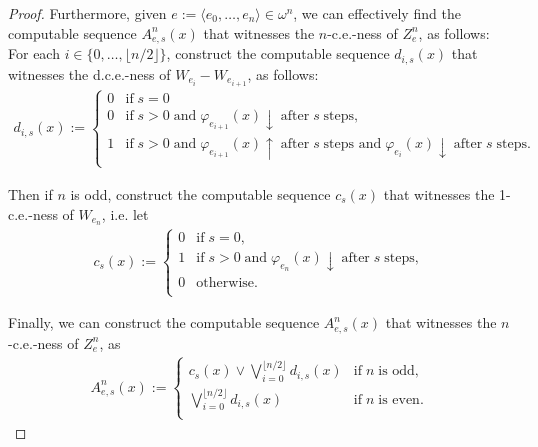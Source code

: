 \documentclass{article}
\begin{document}
\begin{enumerate}[label={\bf Q\arabic*:}]
\begin{proof}
      Furthermore, given $e:=\langle e_0,\ldots,e_{n}\rangle\in
      \omega^{n}$, we can effectively find the computable sequence
      $A_{e,s}^n(x)$ that witnesses the $n$-c.e.-ness of $Z_e^n$, as
      follows: For each $i\in\{0,\ldots,\lfloor n/2\rfloor\}$, construct
      the computable sequence $d_{i,s}(x)$ that witnesses the d.c.e.-ness
      of $W_{e_i}-W_{e_{i+1}}$, as follows:
      \begin{align*}
        d_{i,s}(x) :=
        \begin{cases}
          0 &\text{if}\; s=0\\
          0 &\text{if}\; s>0\; \text{and}\; \varphi_{e_{i+1}}(x)\downarrow\;
            \text{after}\; s\; \text{steps},\\
          1 &\text{if}\; s>0\; \text{and}\; \varphi_{e_{i+1}}(x)\uparrow\;
            \text{after}\; s\; \text{steps and}\; \varphi_{e_i}(x)\downarrow\;
            \text{after}\; s\; \text{steps}.\\
        \end{cases}
      \end{align*}

      Then if $n$ is odd, construct the computable sequence $c_s(x)$ that
      witnesses the 1-c.e.-ness of $W_{e_n}$, i.e. let
      \begin{align*}
        c_{s}(x) :=
        \begin{cases}
          0 &\text{if}\; s=0,\\
          1 &\text{if}\; s>0\; \text{and}\; \varphi_{e_n}(x)\downarrow\;
            \text{after}\; s\; \text{steps},\\
          0 &\text{otherwise}.\\
        \end{cases}
      \end{align*}

      Finally, we can construct the computable sequence
      $A_{e,s}^n(x)$ that witnesses the $n$-c.e.-ness of $Z_e^n$, as
      \begin{align*}
        A_{e,s}^n(x) :=
        \begin{cases}
          c_s(x) \vee \bigvee_{i=0}^{\lfloor n/2\rfloor} d_{i,s}(x)
            &\text{if}\; n\; \text{is odd},\\
          \bigvee_{i=0}^{\lfloor n/2\rfloor} d_{i,s}(x)
            &\text{if}\; n\; \text{is even}.\\
        \end{cases}
      \end{align*}


\end{proof}
\end{enumerate}
\end{document}
